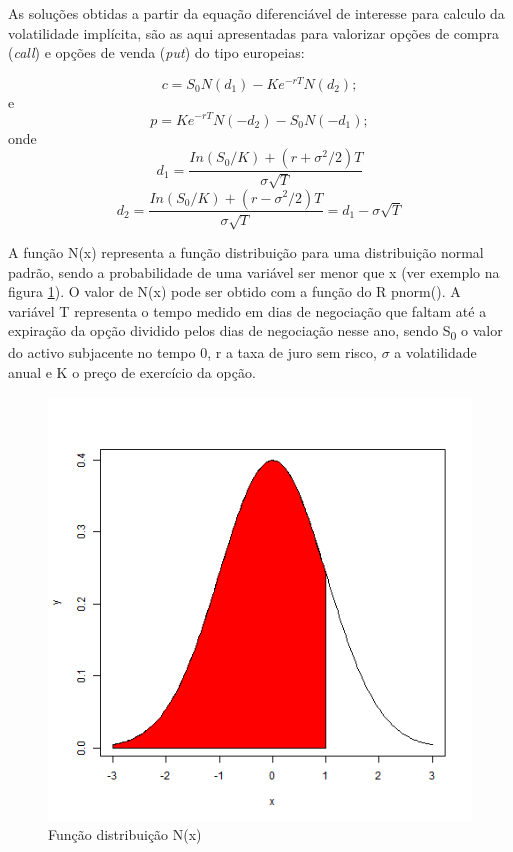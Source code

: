 \documentclass[
  12pt,
  a4paper,
  openany]{book}
\begin{document}
As soluções obtidas a partir da equação diferenciável de interesse para calculo da volatilidade implícita, são as aqui apresentadas para valorizar opções de compra (\emph{call}) e opções de venda (\emph{put}) do tipo europeias:

\begin{equation} 
  c = S_0N(d_1) - Ke^{-rT}N(d_2);
  \label{eq:call}
\end{equation}
e
\begin{equation} 
  p = Ke^{-rT}N(-d_2) - S_0N(-d_1);
  \label{eq:put}
\end{equation}
onde
\begin{equation} 
  d_1 = \frac{In(S_0/K)+(r+\sigma^2/2)T}{\sigma\sqrt{T}}
  \label{eq:d1}
\end{equation}
\begin{equation} 
  d_2 = \frac{In(S_0/K)+(r-\sigma^2/2)T}{\sigma\sqrt{T}}=d_1-\sigma\sqrt{T}
  \label{eq:d2}
\end{equation}

A função N(x) representa a função distribuição para uma distribuição normal padrão, sendo a probabilidade de uma variável ser menor que x (ver exemplo na figura \ref{fig:fdistribuicao}). O valor de N(x) pode ser obtido com a função do R pnorm(). A variável T representa o tempo medido em dias de negociação que faltam até a expiração da opção dividido pelos dias de negociação nesse ano, sendo S\textsubscript{0} o valor do activo subjacente no tempo 0, r a taxa de juro sem risco, \(\sigma\) a volatilidade anual e K o preço de exercício da opção.

\begin{figure}

{\centering \includegraphics[width=0.45\linewidth]{image/fdistribuicao} 

}

\caption{Função distribuição N(x)}\label{fig:fdistribuicao}
\end{figure}
\centering
\end{document}
